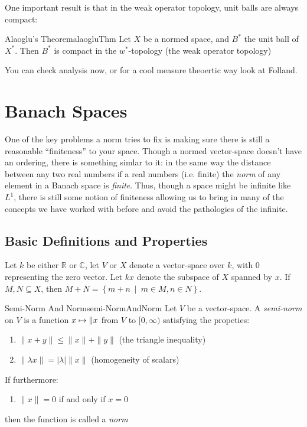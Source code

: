 \documentclass[oneside]{book}
\newcommand{\R}{\mathbb{R}}
\newcommand{\C}{\mathbb{C}}
\newcommand{\sse}{\subseteq}
\newcommand{\set}[2]{\left\{#1 \ \middle|\ #2\right\}}
\begin{document}
One important result is that in the weak operator topology, unit balls are always compact:

\begin{thm}{Alaoglu's Theorem}{alaogluThm}
	Let $X$ be a normed space, and $B^*$ the unit ball of $X^*$. Then $B^*$ is compact in the $w^*$-topology (the
	weak operator topology)
\end{thm}

\begin{Proof}
	You can check analysis now, or for a cool measure theoertic way look at Folland.
\end{Proof}



\chapter{Banach Spaces}

One of the key problems a norm tries to fix is making sure there is still a reasonable ``finiteness'' to your
space. Though a normed vector-space doesn't have an ordering, there is something simlar to it: in the same way the
distance between any two real numbers if a real numbers (i.e. finite) the \emph{norm} of any element in a Banach space
is \emph{finite}. Thus, though a space might be infinite like $L^1$, there is still some notion of finiteness allowing
us to bring in many of the concepts we have worked with before and avoid the pathologies of the infinite.

\section{Basic Definitions and Properties}

Let $k$ be either $\R$ or $\C$, let $V$ or $X$ denote a vector-space over $k$, with $0$ representing the zero vector.
Let $kx$ denote the subspace of $X$ spanned by $x$. If $M, N \sse X$, then $M + N = \set{m + n}{m \in M, n \in N}$.

\begin{defn}{Semi-Norm And Norm}{semi-NormAndNorm}
	Let $V$ be a vector-space. A \emph{semi-norm} on $V$ is a function $x \mapsto \|x\\$ from $V$ to $[0, \infty)$
	satisfying the propeties:
	\begin{enumerate}
		\item $\|x + y\| \le \|x\| + \|y\|$ (the triangle inequality)
		\item $\|\lambda x\| = |\lambda|\|x\|$ (homogeneity of scalars)
	\end{enumerate}
	If furthermore:
	\begin{enumerate}
		\item[(3)] $\|x\| = 0$ if and only if $x = 0$
	\end{enumerate}
	then the function is called a \emph{norm}
\end{defn}
\end{document}
